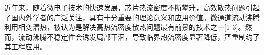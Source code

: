 近年来，随着微电子技术的快速发展，芯片热流密度不断攀升，高效散热问题引起了国内外学者的广泛关注，具有十分重要的理论意义和应用价值。微通道流动沸腾利用相变潜热，被认为是解决高热流密度散热问题最有前景的技术之一[1-3]。然而，流动沸腾不稳定性会诱发局部干涸，导致临界热流密度显著降低，严重制约了其工程应用。